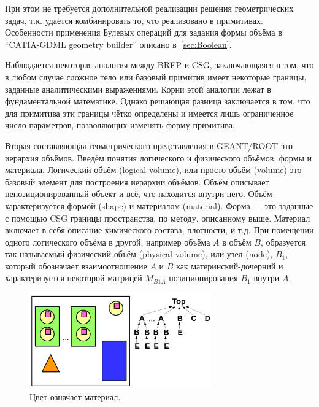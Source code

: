 При этом не требуется дополнительной реализации решения геометрических задач, т.к. удаётся комбинировать то, что реализовано в примитивах.
Особенности применения Булевых операций для задания формы объёма в ``CATIA-GDML geometry builder'' описано в~\ref{sec:Boolean}.

Наблюдается некоторая аналогия между BREP и CSG, заключающаяся в том, что в любом случае сложное тело или базовый примитив имеет некоторые границы, заданные аналитическими выражениями. Корни этой аналогии лежат в фундаментальной математике. Однако решающая разница заключается в том, что для примитива эти границы чётко определены и имеется лишь ограниченное число параметров, позволяющих изменять форму примитива.

Вторая составляющая геометрического представления в GEANT/ROOT это иерархия объёмов.
Введём понятия логического и физического объёмов, формы и материала. Логический объём (logical volume), или просто объём (volume) это базовый элемент для построения иерархии объёмов. Объём описывает непозиционированный объект и всё, что находится внутри него. Объём характеризуется формой (shape) и материалом (material). Форма --- это заданные с помощью CSG границы пространства, по методу, описанному выше. Материал включает в себя описание химического состава, плотности, и т.д. При помещении одного логического объёма в другой, например объёма $A$ в объём $B$, образуется так называемый физический объём (physical volume), или узел (node), $B_1$, который обозначает взаимоотношение $A$ и $B$ как материнский-дочерний и характеризуется некоторой матрицей $M_{B1A}$ позиционирования $B_1$ внутри $A$.

\begin{figure}[H]
\centering
\includegraphics[width=0.7\textwidth]{pictures/ROOT_geo1.png}
\caption{Цвет означает материал.} %
\label{fig:ROOTgeo1}
\end{figure}

